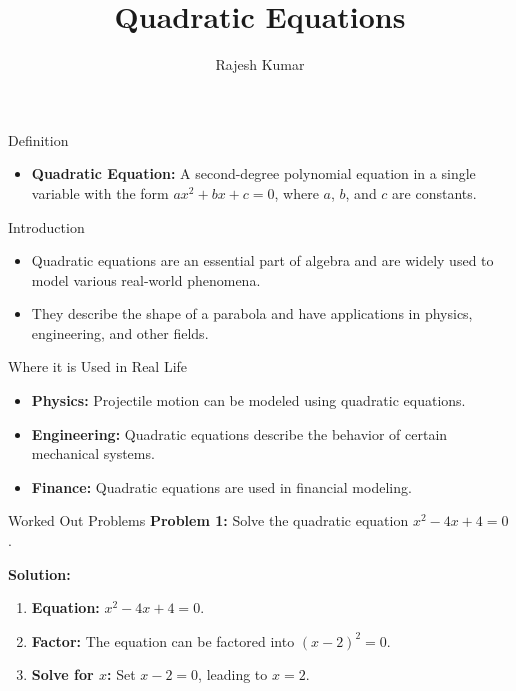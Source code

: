 \title{Quadratic Equations}
\author{Rajesh Kumar}
\date{}

\begin{frame}
  \titlepage
\end{frame}

\begin{frame}{Definition}
  \begin{itemize}
    \item \textbf{Quadratic Equation:} A second-degree polynomial equation in a single variable with the form $ax^2 + bx + c = 0$, where $a$, $b$, and $c$ are constants.
  \end{itemize}
\end{frame}

\begin{frame}{Introduction}
  \begin{itemize}
    \item Quadratic equations are an essential part of algebra and are widely used to model various real-world phenomena.
    \item They describe the shape of a parabola and have applications in physics, engineering, and other fields.
  \end{itemize}
\end{frame}

\begin{frame}{Where it is Used in Real Life}
  \begin{itemize}
    \item \textbf{Physics:} Projectile motion can be modeled using quadratic equations.
    \item \textbf{Engineering:} Quadratic equations describe the behavior of certain mechanical systems.
    \item \textbf{Finance:} Quadratic equations are used in financial modeling.
  \end{itemize}
\end{frame}

\begin{frame}{Worked Out Problems}
  \textbf{Problem 1:} Solve the quadratic equation $x^2 - 4x + 4 = 0$.

  \textbf{Solution:}
  \begin{enumerate}
    \item \textbf{Equation:} $x^2 - 4x + 4 = 0$.
    \item \textbf{Factor:} The equation can be factored into $(x - 2)^2 = 0$.
    \item \textbf{Solve for $x$:} Set $x - 2 = 0$, leading to $x = 2$.
  \end{enumerate}
\end{frame}

